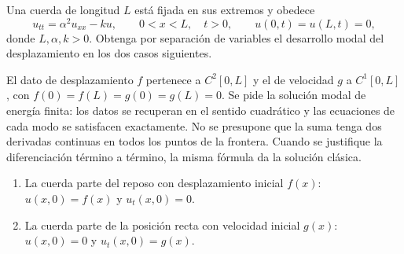 Una cuerda de longitud $L$ está fijada en sus extremos y obedece
\[
u_{tt}=\alpha^2u_{xx}-ku,\qquad 0<x<L,\quad t>0,
\qquad u(0,t)=u(L,t)=0,
\]
donde $L,\alpha,k>0$. Obtenga por separación de variables el desarrollo modal
del desplazamiento en los dos casos siguientes.

El dato de desplazamiento $f$ pertenece a $C^2[0,L]$ y el de velocidad
$g$ a $C^1[0,L]$, con $f(0)=f(L)=g(0)=g(L)=0$.
Se pide la solución modal de energía finita: los datos se recuperan en el
sentido cuadrático y las ecuaciones de cada modo se satisfacen exactamente.
No se presupone que la suma tenga dos derivadas continuas en todos los puntos
de la frontera. Cuando se justifique la diferenciación término a término,
la misma fórmula da la solución clásica.

\begin{enumerate}[label=(\alph*),ref=\alph*,leftmargin=*]
\item La cuerda parte del reposo con desplazamiento inicial $f(x)$:
$u(x,0)=f(x)$ y $u_t(x,0)=0$.
\item La cuerda parte de la posición recta con velocidad inicial $g(x)$:
$u(x,0)=0$ y $u_t(x,0)=g(x)$.
\end{enumerate}
